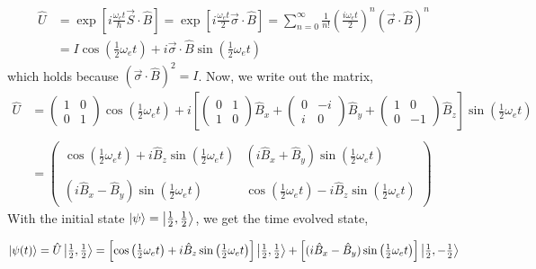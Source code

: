 \documentclass[12pt]{extarticle}
\begin{document}
\begin{align*}
\hat{U} & = \exp{\left[i \frac{\omega_{e} t }{\hbar} \vec{S} \cdot \hat{B} \right]} = \exp{\left[i \frac{\omega_{e} t }{2} \vec{\sigma} \cdot \hat{B} \right]} = \sum_{n = 0}^{\infty} \frac{1}{n!} \left(\frac{i \omega_{e} t}{2}\right)^n ( \vec{\sigma} \cdot \hat{B} )^n \\
& = I \cos{\left(\tfrac{1}{2} \omega_{e} t \right)} + i \vec{\sigma} \cdot \hat{B} \sin{\left(\tfrac{1}{2} \omega_{e} t \right)}
\end{align*} 
which holds because $(\vec{\sigma} \cdot \hat{B})^2 = I$. Now, we write out the matrix,
\begin{align*}
\hat{U} & = 
\begin{pmatrix}
1 & 0 \\
0 & 1
\end{pmatrix} 
\cos{\left(\tfrac{1}{2} \omega_{e} t \right)} + 
i \left[
\begin{pmatrix}
0 & 1 \\
1 & 0
\end{pmatrix} \hat{B}_x +
\begin{pmatrix}
0 & -i \\
i & 0
\end{pmatrix} \hat{B}_y  +
\begin{pmatrix}
1 & 0 \\
0 & -1
\end{pmatrix} \hat{B}_z \right] \sin{\left(\tfrac{1}{2} \omega_{e} t \right)} \\\\
& = 
\begin{pmatrix}
\cos{\left(\tfrac{1}{2} \omega_{e} t \right)} + i \hat{B}_z \sin{\left(\tfrac{1}{2} \omega_{e} t \right)} & (i \hat{B}_x + \hat{B}_y) \sin{\left(\tfrac{1}{2} \omega_{e} t \right)} \\ \\
(i \hat{B}_x - \hat{B}_y) \sin{\left(\tfrac{1}{2} \omega_{e} t \right)}  & \cos{\left(\tfrac{1}{2} \omega_{e} t \right)} - i \hat{B}_z \sin{\left(\tfrac{1}{2} \omega_{e} t \right)}
\end{pmatrix}
\end{align*}
With the initial state $\left| \psi \right> = \left| \tfrac{1}{2}, \tfrac{1}{2} \right>$, we get the time evolved state,

\[\left| \psi(t) \right> = \hat{U} \left| \tfrac{1}{2}, \tfrac{1}{2} \right> = \left[ \cos{\left(\tfrac{1}{2} \omega_{e} t \right)} + i \hat{B}_z \sin{\left(\tfrac{1}{2} \omega_{e} t \right)} \right] \left| \tfrac{1}{2}, \tfrac{1}{2} \right> + \left[ (i \hat{B}_x - \hat{B}_y) \sin{\left(\tfrac{1}{2} \omega_{e} t \right)} \right] \left| \tfrac{1}{2}, - \tfrac{1}{2} \right>  \] 
\end{document}
